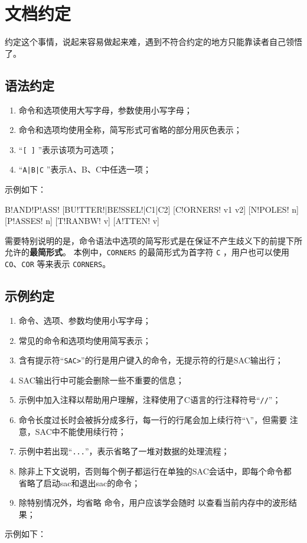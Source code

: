 \section{文档约定}
约定这个事情，说起来容易做起来难，遇到不符合约定的地方只能靠读者自己领悟了。

\subsection*{语法约定}
\begin{enumerate}
\item 命令和选项使用大写字母，参数使用小写字母；
\item 命令和选项均使用全称，简写形式可省略的部分用灰色表示；
\item ``\texttt{[ ]} ''表示该项为可选项；
\item ``\texttt{A|B|C} ''表示A、B、C中任选一项；
\end{enumerate}

示例如下：
\begin{SACSTX}
B!AND!P!ASS! [BU!TTER!|BE!SSEL!|C1|C2] [C!ORNERS! v1 v2] [N!POLES! n] [P!ASSES! n]
    [T!RANBW! v] [A!TTEN! v]
\end{SACSTX}

需要特别说明的是，命令语法中选项的简写形式是在保证不产生歧义下的前提下所允许的\textbf{最简形式}。
本例中，\texttt{CORNERS} 的最简形式为首字符 \texttt{C} ，用户也可以使用
\texttt{CO}、\texttt{COR} 等来表示 \texttt{CORNERS}。

\subsection*{示例约定}
\begin{enumerate}
\item 命令、选项、参数均使用小写字母；
\item 常见的命令和选项均使用简写表示；
\item 含有提示符``\texttt{SAC>}''的行是用户键入的命令，无提示符的行是SAC输出行；
\item SAC输出行中可能会删除一些不重要的信息；
\item 示例中加入注释以帮助用户理解，注释使用了C语言的行注释符号``\texttt{//}''；
\item 命令长度过长时会被拆分成多行，每一行的行尾会加上续行符``\verb|\|''，但需要
    注意，SAC中不能使用续行符；
\item 示例中若出现``\texttt{...}''，表示省略了一堆对数据的处理流程；
\item 除非上下文说明，否则每个例子都运行在单独的SAC会话中，即每个命令都
    省略了启动sac和退出sac的命令；
\item 除特别情况外，均省略  命令，用户应该学会随时  以查看当前内存中的波形结果；
\end{enumerate}

示例如下：
